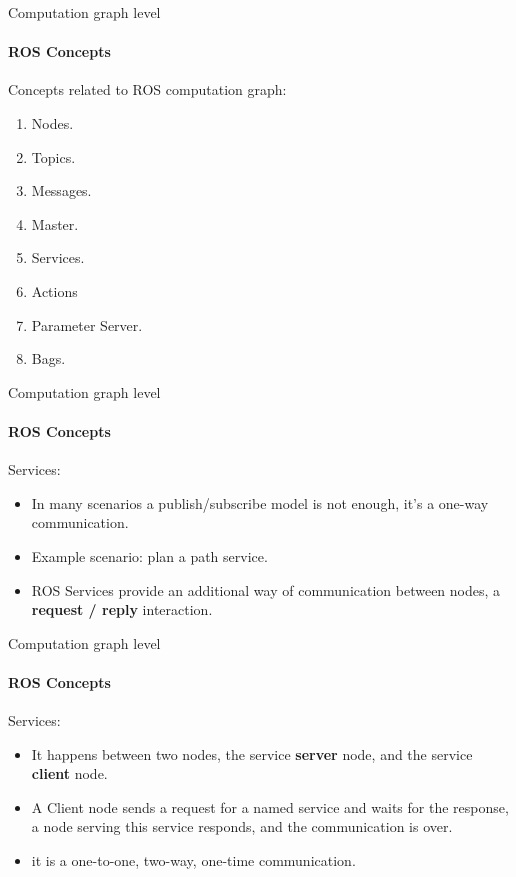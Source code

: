 \documentclass{beamer}
\begin{document}
\begin{frame}{Computation graph level}
    \framesubtitle{ROS Concepts}
    
    Concepts related to ROS computation graph:
    
    \begin{enumerate}
        \item \textcolor{black!40}{Nodes.}
        \item \textcolor{black!40}{Topics.}
        \item \textcolor{black!40}{Messages.}
        \item \textcolor{black!40}{Master.}
        \item Services.
        \item Actions
        \item Parameter Server.
        \item Bags.
    \end{enumerate}
\end{frame}



\begin{frame}{Computation graph level}
    \framesubtitle{ROS Concepts}
    {\huge Services:}
    \vspace{0.2cm}
    \begin{itemize}
        \item In many scenarios a publish/subscribe model is not enough, it’s a one-way
        communication.
        
        \item Example scenario: plan a path service.
        
        
        \item ROS Services provide an additional way of communication between nodes, a  \textbf{request / reply}
        interaction.
    \end{itemize}  
\end{frame}

\begin{frame}{Computation graph level}
    \framesubtitle{ROS Concepts}
    {\huge Services:}
    \vspace{0.2cm}
    \begin{itemize}
        \item It happens between two nodes, the service \textbf{server} node, and the service \textbf{client} node.
        
        \item A Client node sends a request for a named service and waits for the response, a node serving this service responds, and the communication is over.
        
        \item it is a one-to-one, two-way, one-time communication.
    \end{itemize}  
\end{frame}
\end{document}
